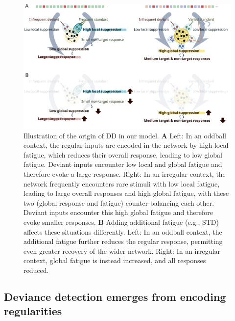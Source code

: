 \documentclass[9pt,lineno,onehalfspacing]{elife}
\begin{document}
\begin{figure}
    \includegraphics[width=\linewidth]{fig-conclusion}
    \caption{%
        Illustration of the origin of DD in our model.
        \textbf{A} Left: In an oddball context, the regular inputs are encoded in the network by high local fatigue, which reduces their overall response, leading to low global fatigue. Deviant inputs encounter low local and global fatigue and therefore evoke a large response. Right: In an irregular context, the network frequently encounters rare stimuli with low local fatigue, leading to large overall responses and high global fatigue, with these two (global response and fatigue) counter-balancing each other. Deviant inputs encounter this high global fatigue and therefore evoke smaller responses.
        \textbf{B} Adding additional fatigue (e.g., STD) affects these situations differently. Left: In an oddball context, the additional fatigue further reduces the regular response, permitting even greater recovery of the wider network. Right: In an irregular context, global fatigue is instead increased, and all responses reduced.
    }
    \label{fig:conclusion}
\end{figure}

\subsection{Deviance detection emerges from encoding regularities}
\end{document}
